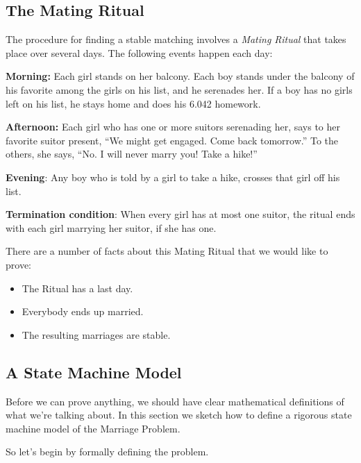 \subsection{The Mating Ritual}

The procedure for finding a stable matching involves a \emph{Mating
Ritual} that takes place over several days.  The following events happen
each day:

{\bf Morning: } Each girl stands on her balcony.  Each boy stands under
the balcony of his favorite among the girls on his list, and he serenades
her.  If a boy has no girls left on his list, he stays home and does his
6.042 homework.

{\bf Afternoon: } Each girl who has one or more suitors serenading her,
says to her favorite suitor present, ``We might get engaged.  Come back
tomorrow.''  To the others, she says, ``No.  I will never marry you!  Take
a hike!''

\textbf{Evening}: Any boy who is told by a girl to take a hike, crosses that
girl off his list.

\textbf{Termination condition}: When every girl has at most one suitor,
the ritual ends with each girl marrying her suitor, if she has one.


There are a number of facts about this Mating Ritual that we would like to
prove:

\begin{itemize}
\item The Ritual has a last day.
\item Everybody ends up married.
\item The resulting marriages are stable.
\end{itemize}

\subsection{A State Machine Model}

Before we can prove anything, we should have clear mathematical
definitions of what we're talking about.  In this section we sketch how to
define a rigorous state machine model of the Marriage Problem.

So let's begin by formally defining the problem.

